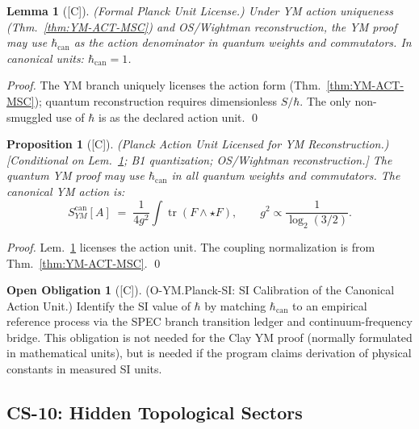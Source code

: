 \documentclass[12pt,oneside]{amsbook}
\theoremstyle{plain}
\newtheorem{lemma}[theorem]{Lemma}
\newtheorem{proposition}[theorem]{Proposition}
\theoremstyle{definition}
\newtheorem{obligation}[theorem]{Open Obligation}
\theoremstyle{remark}
\newcommand{\status}[1]{\textup{[#1]}}
\begin{document}
\begin{lemma}[\status{C}]\label{lem:hbar-formal-license}
\textup{(Formal Planck Unit License.)}
Under YM action uniqueness (Thm.~\ref{thm:YM-ACT-MSC}) and OS/Wightman
reconstruction, the YM proof may use $\hbar_{\mathrm{can}}$ as the
action denominator in quantum weights and commutators.
In canonical units: $\hbar_{\mathrm{can}}=1$.
\end{lemma}

\begin{proof}
The YM branch uniquely licenses the action form (Thm.~\ref{thm:YM-ACT-MSC});
quantum reconstruction requires dimensionless $S/\hbar$. The only
non-smuggled use of $\hbar$ is as the declared action unit.
\qed
\end{proof}

\begin{proposition}[\status{C}]\label{prop:Planck-action-license}
\textup{(Planck Action Unit Licensed for YM Reconstruction.)}
\textup{[Conditional on Lem.~\ref{lem:hbar-formal-license}; B1
quantization; OS/Wightman reconstruction.]}
The quantum YM proof may use $\hbar_{\mathrm{can}}$ in all quantum
weights and commutators. The canonical YM action is:
\[
 S_{YM}^{\mathrm{can}}[A] \;=\;
 \frac{1}{4g^2}\int\operatorname{tr}(F\wedge\star F),
 \qquad g^2\propto\frac{1}{\log_2(3/2)}.
\]
\end{proposition}

\begin{proof}
Lem.~\ref{lem:hbar-formal-license} licenses the action unit.
The coupling normalization is from Thm.~\ref{thm:YM-ACT-MSC}.
\qed
\end{proof}

\begin{obligation}[\status{C}]\label{ob:Planck-SI-calibration}
\textup{(O-YM.Planck-SI: SI Calibration of the Canonical Action Unit.)}
Identify the SI value of $\hbar$ by matching $\hbar_{\mathrm{can}}$
to an empirical reference process via the SPEC branch transition
ledger and continuum-frequency bridge. This obligation is not needed
for the Clay YM proof (normally formulated in mathematical units), but
is needed if the program claims derivation of physical constants in
measured SI units.
\end{obligation}



\subsection{CS-10: Hidden Topological Sectors}
\end{document}
